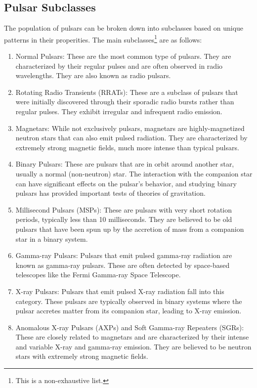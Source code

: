 \subsection{Pulsar Subclasses}

The population of pulsars can be broken down into subclasses based on unique patterns in their properities. The main subclasses\footnote{This is a non-exhaustive list.} are as follows:

\begin{enumerate}
    \item Normal Pulsars: These are the most common type of pulsars. They are characterized by their regular pulses and are often observed in radio wavelengths. They are also known as radio pulsars. %

    \item Rotating Radio Transients (RRATs): These are a subclass of pulsars that were initially discovered through their sporadic radio bursts rather than regular pulses. They exhibit irregular and infrequent radio emission.

    \item Magnetars: While not exclusively pulsars, magnetars are highly-magnetized neutron stars that can also emit pulsed radiation. They are characterized by extremely strong magnetic fields, much more intense than typical pulsars.

    \item Binary Pulsars: These are pulsars that are in orbit around another star, usually a normal (non-neutron) star. The interaction with the companion star can have significant effects on the pulsar's behavior, and studying binary pulsars has provided important tests of theories of gravitation.

    \item Millisecond Pulsars (MSPs): These are pulsars with very short rotation periods, typically less than 10 milliseconds. They are believed to be old pulsars that have been spun up by the accretion of mass from a companion star in a binary system.

    \item Gamma-ray Pulsars: Pulsars that emit pulsed gamma-ray radiation are known as gamma-ray pulsars. These are often detected by space-based telescopes like the Fermi Gamma-ray Space Telescope.

    \item X-ray Pulsars: Pulsars that emit pulsed X-ray radiation fall into this category. These pulsars are typically observed in binary systems where the pulsar accretes matter from its companion star, leading to X-ray emission.

    \item Anomalous X-ray Pulsars (AXPs) and Soft Gamma-ray Repeaters (SGRs): These are closely related to magnetars and are characterized by their intense and variable X-ray and gamma-ray emission. They are believed to be neutron stars with extremely strong magnetic fields.
\end{enumerate}

